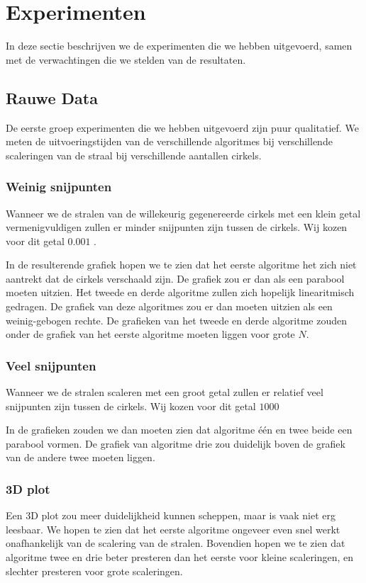 \newpage
\section{Experimenten}
In deze sectie beschrijven we de experimenten die we hebben uitgevoerd, samen met de verwachtingen die we stelden van de resultaten.

\subsection{Rauwe Data}
De eerste groep experimenten die we hebben uitgevoerd zijn puur qualitatief. We meten de uitvoeringstijden van de verschillende algoritmes bij verschillende scaleringen van de straal bij verschillende aantallen cirkels.

\subsubsection{Weinig snijpunten}
Wanneer we de stralen van de willekeurig gegenereerde cirkels met een klein getal vermenigvuldigen zullen er minder snijpunten zijn tussen de cirkels. Wij kozen voor dit getal $0.001$ .

In de resulterende grafiek hopen we te zien dat het eerste algoritme het zich niet aantrekt dat de cirkels verschaald zijn. De grafiek zou er dan als een parabool moeten uitzien. Het tweede en derde algoritme zullen zich hopelijk linearitmisch gedragen. De grafiek van deze algoritmes zou er dan moeten uitzien als een weinig-gebogen rechte. De grafieken van het tweede en derde algoritme zouden onder de grafiek van het eerste algoritme moeten liggen voor grote $N$.

\subsubsection{Veel snijpunten}
Wanneer we de stralen scaleren met een groot getal zullen er relatief veel snijpunten zijn tussen de cirkels. Wij kozen voor dit getal $1000$ 

In de grafieken zouden we dan moeten zien dat algoritme \'e\'en en twee beide een parabool vormen. De grafiek van algoritme drie zou duidelijk boven de grafiek van de andere twee moeten liggen.

\subsubsection{3D plot}
Een 3D plot zou meer duidelijkheid kunnen scheppen, maar is vaak niet erg leesbaar. We hopen te zien dat het eerste algoritme ongeveer even snel werkt onafhankelijk van de scalering van de stralen. Bovendien hopen we te zien dat algoritme twee en drie beter presteren dan het eerste voor kleine scaleringen, en slechter presteren voor grote scaleringen.



